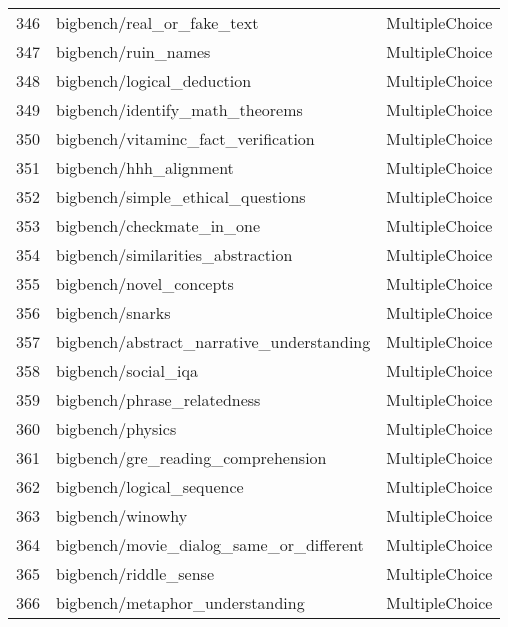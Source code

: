 \documentclass[11pt]{article}
\begin{document}
\begin{longtable}{lll}
346 & bigbench/real\_or\_fake\_text \citep{srivastava2022beyond} & MultipleChoice \\
347 & bigbench/ruin\_names \citep{srivastava2022beyond} & MultipleChoice \\
348 & bigbench/logical\_deduction \citep{srivastava2022beyond} & MultipleChoice \\
349 & bigbench/identify\_math\_theorems \citep{srivastava2022beyond} & MultipleChoice \\
350 & bigbench/vitaminc\_fact\_verification \citep{srivastava2022beyond} & MultipleChoice \\
351 & bigbench/hhh\_alignment \citep{srivastava2022beyond} & MultipleChoice \\
352 & bigbench/simple\_ethical\_questions \citep{srivastava2022beyond} & MultipleChoice \\
353 & bigbench/checkmate\_in\_one \citep{srivastava2022beyond} & MultipleChoice \\
354 & bigbench/similarities\_abstraction \citep{srivastava2022beyond} & MultipleChoice \\
355 & bigbench/novel\_concepts \citep{srivastava2022beyond} & MultipleChoice \\
356 & bigbench/snarks \citep{srivastava2022beyond} & MultipleChoice \\
357 & bigbench/abstract\_narrative\_understanding \citep{srivastava2022beyond} & MultipleChoice \\
358 & bigbench/social\_iqa \citep{srivastava2022beyond} & MultipleChoice \\
359 & bigbench/phrase\_relatedness \citep{srivastava2022beyond} & MultipleChoice \\
360 & bigbench/physics \citep{srivastava2022beyond} & MultipleChoice \\
361 & bigbench/gre\_reading\_comprehension \citep{srivastava2022beyond} & MultipleChoice \\
362 & bigbench/logical\_sequence \citep{srivastava2022beyond} & MultipleChoice \\
363 & bigbench/winowhy \citep{srivastava2022beyond} & MultipleChoice \\
364 & bigbench/movie\_dialog\_same\_or\_different \citep{srivastava2022beyond} & MultipleChoice \\
365 & bigbench/riddle\_sense \citep{srivastava2022beyond} & MultipleChoice \\
366 & bigbench/metaphor\_understanding \citep{srivastava2022beyond} & MultipleChoice \\

\end{longtable}
\end{document}
